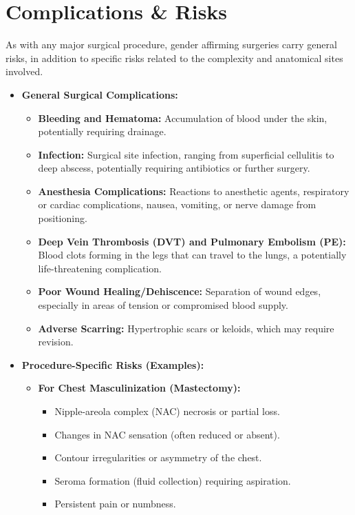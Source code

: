 \section*{Complications \& Risks}
As with any major surgical procedure, gender affirming surgeries carry general risks, in addition to specific risks related to the complexity and anatomical sites involved.

\begin{itemize}
  \item \textbf{General Surgical Complications:}
    \begin{itemize}
      \item \textbf{Bleeding and Hematoma:} Accumulation of blood under the skin, potentially requiring drainage.
      \item \textbf{Infection:} Surgical site infection, ranging from superficial cellulitis to deep abscess, potentially requiring antibiotics or further surgery.
      \item \textbf{Anesthesia Complications:} Reactions to anesthetic agents, respiratory or cardiac complications, nausea, vomiting, or nerve damage from positioning.
      \item \textbf{Deep Vein Thrombosis (DVT) and Pulmonary Embolism (PE):} Blood clots forming in the legs that can travel to the lungs, a potentially life-threatening complication.
      \item \textbf{Poor Wound Healing/Dehiscence:} Separation of wound edges, especially in areas of tension or compromised blood supply.
      \item \textbf{Adverse Scarring:} Hypertrophic scars or keloids, which may require revision.
    \end{itemize}
  \item \textbf{Procedure-Specific Risks (Examples):}
    \begin{itemize}
      \item \textbf{For Chest Masculinization (Mastectomy):}
        \begin{itemize}
          \item Nipple-areola complex (NAC) necrosis or partial loss.
          \item Changes in NAC sensation (often reduced or absent).
          \item Contour irregularities or asymmetry of the chest.
          \item Seroma formation (fluid collection) requiring aspiration.
          \item Persistent pain or numbness.

\end{itemize}
\end{itemize}
\end{itemize}
